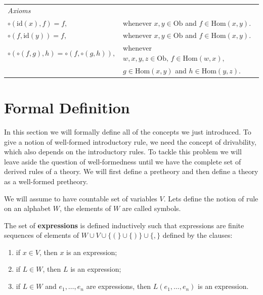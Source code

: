 \begin{tabular}{ll}
\textit{Axioms} \\[6pt]
$\circ(\mathrm{id}(x), f) = f,$ & whenever $x, y \in \mathrm{Ob}$ and $f \in \mathrm{Hom}(x, y).$ \\[4pt]
$\circ(f, \mathrm{id}(y)) = f,$ & whenever $x, y \in \mathrm{Ob}$ and $f \in \mathrm{Hom}(x, y).$ \\[4pt]
$\circ(\circ(f, g), h) = \circ(f, \circ(g, h)),$ 
  & whenever $w, x, y, z \in \mathrm{Ob},\, f \in \mathrm{Hom}(w, x),$ \\
  & \hspace{4.5em} $g \in \mathrm{Hom}(x, y)$ and $h \in \mathrm{Hom}(y, z).$ \\
\end{tabular}

\section{Formal Definition}

In this section we will formally define all of the concepts 
we just introduced.
To give a notion of well-formed introductory rule, we need the concept of drivability,
which also depends on the introductory rules. 
To tackle this problem we will leave aside the question of
well-formedness until we have the complete set of derived rules
of a theory.
We will first define a pretheory and then define a theory
as a well-formed pretheory.

We will assume to have countable set of variables $V$.
Lets define the notion of rule on an alphabet $W$,
the elements of $W$ are called symbols.

\begin{definition}
    The set of \textbf{expressions} is defined inductively
    such that expressions are finite sequences of elements
    of $W \cup V \cup \{(\} \cup \{)\} \cup \{,\}$
    defined by the clauses:
    \begin{enumerate}
        \item if $x \in V$, then $x$ is an expression;
        \item if $L \in W$, then $L$ is an expression;
        \item if $L \in W$ and $e_1, \dots, e_n$ are expressions,
              then $L(e_1, \dots, e_n)$ is an expression.
    \end{enumerate}
\end{definition}

